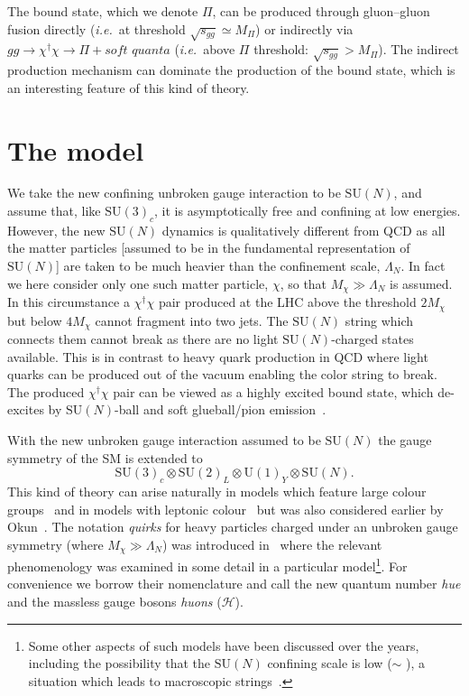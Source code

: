The bound state, which we denote $\Pi$, can be produced through gluon--gluon
fusion directly (\textit{i.e.}\ at threshold $\sqrt{s_{gg}} \simeq M_\Pi$) or
indirectly via
$gg \rightarrow \chi^\dagger \chi \rightarrow \Pi + \textit{soft quanta}$
(\textit{i.e.}\ above $\Pi$ threshold: $\sqrt{s_{gg}} > M_\Pi$). The indirect
production mechanism can dominate the production of the bound state, which is an
interesting feature of this kind of theory.

\section{The model}

We take the new confining unbroken gauge interaction to be $\mathrm{SU}(N)$, and
assume that, like $\mathrm{SU}(3)_{c}$, it is asymptotically free and confining
at low energies. However, the new $\mathrm{SU}(N)$ dynamics is qualitatively
different from QCD as all the matter particles [assumed to be in the fundamental
representation of $\mathrm{SU}(N)$] are taken to be much heavier than the
confinement scale, $\Lambda_{N}$. In fact we here consider only one such matter
particle, $\chi$, so that $M_\chi \gg \Lambda_{N}$ is assumed. In this
circumstance a $\chi^\dagger \chi$ pair produced at the LHC above the threshold
$2M_\chi$ but below $4M_\chi$ cannot fragment into two jets. The
$\mathrm{SU}(N)$ string which connects them cannot break as there are no light
$\mathrm{SU}(N)$-charged states available. This is in contrast to heavy quark
production in QCD where light quarks can be produced out of the vacuum enabling
the color string to break. The produced $\chi^\dagger\chi$ pair can be viewed as
a highly excited bound state, which de-excites by $\mathrm{SU}(N)$-ball and soft
glueball/pion emission~\cite{Carlson:1991zn}.

With the new unbroken gauge interaction assumed to be $\mathrm{SU}(N)$ the gauge
symmetry of the SM is extended to
\begin{equation}
  \label{eq:gaugegroup}
  \mathrm{SU(3)}_{c} \otimes \mathrm{SU}(2)_{L} \otimes \mathrm{U}(1)_{Y} \otimes \mathrm{SU}(N).
\end{equation}
This kind of theory can arise naturally in models which feature large colour
groups~\cite{Foot:1990jm, Foot:2011xu, Gherghetta:2016fhp} and in models with
leptonic colour~\cite{Foot:1990dw, Foot:1991fk, Foot:2006ie, Clarke:2011aa} but
was also considered earlier by Okun~\cite{Okun:1980mu}. The notation
\textit{quirks} for heavy particles charged under an unbroken gauge symmetry
(where $M_\chi \gg \Lambda_{N}$) was introduced in~\cite{Carlson:1991zn} where
the relevant phenomenology was examined in some detail in a particular
model\footnote{Some other aspects of such models have been discussed over the
  years, including the possibility that the $\mathrm{SU}(N)$ confining scale is
  low ($\sim$ \keV), a situation which leads to macroscopic
  strings~\cite{Kang:2008ea}.}. For convenience we borrow their nomenclature and
call the new quantum number \textit{hue} and the massless gauge bosons
\textit{huons} ($\mathcal{H}$).

